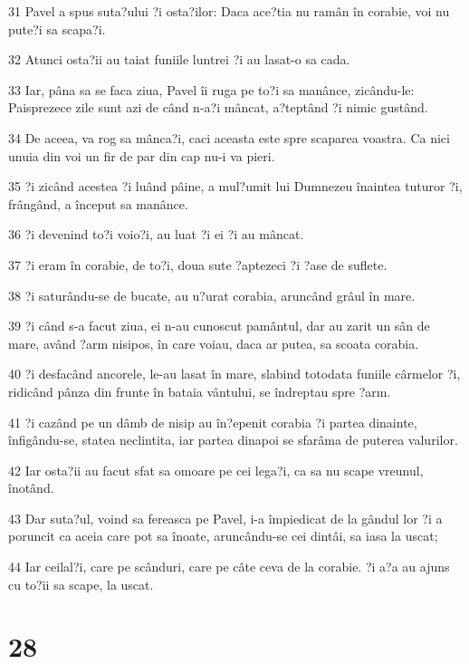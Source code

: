 \par 31 Pavel a spus suta?ului ?i osta?ilor: Daca ace?tia nu ramân în corabie, voi nu pute?i sa scapa?i.
\par 32 Atunci osta?ii au taiat funiile luntrei ?i au lasat-o sa cada.
\par 33 Iar, pâna sa se faca ziua, Pavel îi ruga pe to?i sa manânce, zicându-le: Paisprezece zile sunt azi de când n-a?i mâncat, a?teptând ?i nimic gustând.
\par 34 De aceea, va rog sa mânca?i, caci aceasta este spre scaparea voastra. Ca nici unuia din voi un fir de par din cap nu-i va pieri.
\par 35 ?i zicând acestea ?i luând pâine, a mul?umit lui Dumnezeu înaintea tuturor ?i, frângând, a început sa manânce.
\par 36 ?i devenind to?i voio?i, au luat ?i ei ?i au mâncat.
\par 37 ?i eram în corabie, de to?i, doua sute ?aptezeci ?i ?ase de suflete.
\par 38 ?i saturându-se de bucate, au u?urat corabia, aruncând grâul în mare.
\par 39 ?i când s-a facut ziua, ei n-au cunoscut pamântul, dar au zarit un sân de mare, având ?arm nisipos, în care voiau, daca ar putea, sa scoata corabia.
\par 40 ?i desfacând ancorele, le-au lasat în mare, slabind totodata funiile cârmelor ?i, ridicând pânza din frunte în bataia vântului, se îndreptau spre ?arm.
\par 41 ?i cazând pe un dâmb de nisip au în?epenit corabia ?i partea dinainte, înfigându-se, statea neclintita, iar partea dinapoi se sfarâma de puterea valurilor.
\par 42 Iar osta?ii au facut sfat sa omoare pe cei lega?i, ca sa nu scape vreunul, înotând.
\par 43 Dar suta?ul, voind sa fereasca pe Pavel, i-a împiedicat de la gândul lor ?i a poruncit ca aceia care pot sa înoate, aruncându-se cei dintâi, sa iasa la uscat;
\par 44 Iar ceilal?i, care pe scânduri, care pe câte ceva de la corabie. ?i a?a au ajuns cu to?ii sa scape, la uscat.

\chapter{28}


